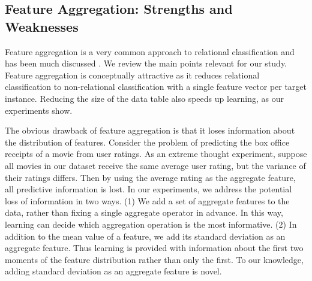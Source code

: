 \documentclass[conference]{IEEEtran}
\begin{document}
\begin{table}[ht]
\caption{Aggregate Functions Used}
\centering
{}
\label{table:functions-used}
\end{table}

\subsection{Feature Aggregation: Strengths and Weaknesses} Feature aggregation is a very common approach to relational classification and has been much discussed \cite{Neville2003,Jensen2003,han2009}. We review the main points relevant for our study. Feature aggregation is conceptually attractive as it reduces relational classification to non-relational classification with a single feature vector per target instance.  Reducing the size of the data table also speeds up learning, as our experiments show.

The obvious drawback of feature aggregation is that it loses information about the distribution of features. Consider the problem of predicting the box office receipts of a movie from user ratings. As an extreme thought experiment, suppose all movies in our dataset receive the same average user rating, but the variance of their ratings differs. Then by using the average rating as the aggregate feature, all predictive information is lost. In our experiments, we address the potential loss of information in two ways. (1) We add a set of aggregate features to the data, rather than fixing a single aggregate operator in advance. In this way, learning can decide which aggregation operation is the most informative. (2) In addition to the mean value of a feature, we add its standard deviation as an aggregate feature. Thus learning is provided with information about the first two moments of the feature distribution rather than only the first. To our knowledge, adding standard deviation as an aggregate feature is novel.
\end{document}
